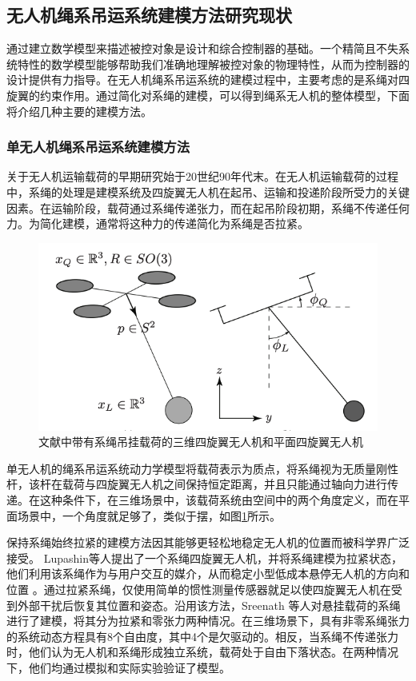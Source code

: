\documentclass[lang=chs, degree=master, blindreview=false, winfonts=true]{yanputhesis}
\begin{document}
\subsection{无人机绳系吊运系统建模方法研究现状}
通过建立数学模型来描述被控对象是设计和综合控制器的基础。一个精简且不失系统特性的数学模型能够帮助我们准确地理解被控对象的物理特性，从而为控制器的设计提供有力指导。在无人机绳系吊运系统的建模过程中，主要考虑的是系绳对四旋翼的约束作用。通过简化对系绳的建模，可以得到绳系无人机的整体模型，下面将介绍几种主要的建模方法。
\subsubsection{单无人机绳系吊运系统建模方法}
关于无人机运输载荷的早期研究始于20世纪90年代末\cite{oshman1999mini,borky1997payload}。在无人机运输载荷的过程中，系绳的处理是建模系统及四旋翼无人机在起吊、运输和投递阶段所受力的关键因素\cite{qian2020guidance}。在运输阶段，载荷通过系绳传递张力，而在起吊阶段初期，系绳不传递任何力\cite{guo2020controlling}。为简化建模，通常将这种力的传递简化为系绳是否拉紧\cite{tang2018aggressive}。

\begin{figure}[hbt!]
	\centering
	\includegraphics[width=28pc]{picture/1_1.png} 
	\caption{文献中带有系绳吊挂载荷的三维四旋翼无人机和平面四旋翼无人机} \label{1_1}
\end{figure}
单无人机的绳系吊运系统动力学模型将载荷表示为质点，将系绳视为无质量刚性杆，该杆在载荷与四旋翼无人机之间保持恒定距离，并且只能通过轴向力进行传递。在这种条件下，在三维场景中，该载荷系统由空间中的两个角度定义，而在平面场景中，一个角度就足够了，类似于摆\cite{sun2021novel}，如图\ref{1_1}所示。

保持系绳始终拉紧的建模方法因其能够更轻松地稳定无人机的位置而被科学界广泛接受。
Lupashin等人提出了一个系绳四旋翼无人机，并将系绳建模为拉紧状态，他们利用该系绳作为与用户交互的媒介，从而稳定小型低成本悬停无人机的方向和位置 \cite{lupashin2013stabilization} 。通过拉紧系绳，仅使用简单的惯性测量传感器就足以使四旋翼无人机在受到外部干扰后恢复其位置和姿态。沿用该方法，Sreenath 等人对悬挂载荷的系绳进行了建模，将其分为拉紧和零张力两种情况\cite{sreenath2013trajectory}。在三维场景下，具有非零系绳张力的系统动态方程具有8个自由度，其中4个是欠驱动的。相反，当系绳不传递张力时，他们认为无人机和系绳形成独立系统，载荷处于自由下落状态。在两种情况下，他们均通过模拟和实际实验验证了模型。
\end{document}
